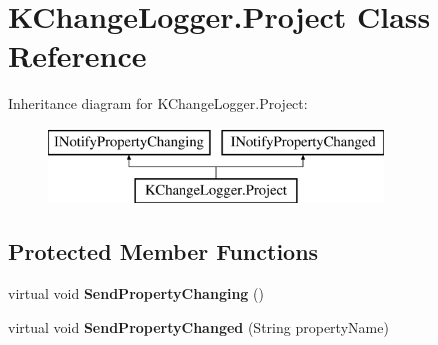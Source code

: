 \hypertarget{class_k_change_logger_1_1_project}{\section{K\-Change\-Logger.\-Project Class Reference}
\label{class_k_change_logger_1_1_project}
}
Inheritance diagram for K\-Change\-Logger.\-Project\-:\begin{figure}[H]
\begin{center}
\leavevmode
\includegraphics[height=2.000000cm]{class_k_change_logger_1_1_project}
\end{center}
\end{figure}
\subsection*{Protected Member Functions}
\begin{DoxyCompactItemize}
\item 
\hypertarget{class_k_change_logger_1_1_project_a74863fd5f2aff5ddb3a4b6c35068883a}{virtual void {\bfseries Send\-Property\-Changing} ()}\label{class_k_change_logger_1_1_project_a74863fd5f2aff5ddb3a4b6c35068883a}

\item 
\hypertarget{class_k_change_logger_1_1_project_a7b0d44f21b944971ac1b07973a10c8dd}{virtual void {\bfseries Send\-Property\-Changed} (String property\-Name)}\label{class_k_change_logger_1_1_project_a7b0d44f21b944971ac1b07973a10c8dd}

\end{DoxyCompactItemize}
